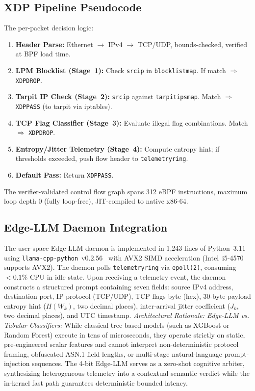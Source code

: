 \documentclass{ieeeaccess}
\renewcommand{\_}{\textunderscore\allowbreak}
\begin{document}
\subsection{XDP Pipeline Pseudocode}
The per-packet decision logic:
\begin{enumerate}\setlength{\itemsep}{0pt}
  \item \textbf{Header Parse:} Ethernet $\to$ IPv4 $\to$ TCP/UDP, bounds-checked,
    verified at BPF load time.
  \item \textbf{LPM Blocklist (Stage~1):} Check \texttt{src\_ip} in
    \texttt{blocklist\_map}. If match $\Rightarrow$ \texttt{XDP\_DROP}.
  \item \textbf{Tarpit IP Check (Stage~2):} \texttt{src\_ip} against
    \texttt{tarpit\_ips\_map}. Match $\Rightarrow$ \texttt{XDP\_PASS} (to tarpit
    via iptables).
  \item \textbf{TCP Flag Classifier (Stage~3):} Evaluate illegal flag combinations.
    Match $\Rightarrow$ \texttt{XDP\_DROP}.
  \item \textbf{Entropy/Jitter Telemetry (Stage~4):} Compute entropy hint; if
    thresholds exceeded, push flow header to \texttt{telemetry\_ring}.
  \item \textbf{Default Pass:} Return \texttt{XDP\_PASS}.
\end{enumerate}
The verifier-validated control flow graph spans 312 eBPF instructions, maximum
loop depth 0 (fully loop-free), JIT-compiled to native x86-64.

\subsection{Edge-LLM Daemon Integration}
The user-space Edge-LLM daemon is implemented in 1{,}243 lines of Python~3.11
using \texttt{llama-cpp-python}~v0.2.56~\cite{llamacpp2024} with AVX2 SIMD
acceleration (Intel~i5-4570 supports AVX2). The daemon polls
\texttt{telemetry\_ring} via \texttt{epoll(2)}, consuming $< 0.1\%$ CPU in
idle state. Upon receiving a telemetry event, the daemon constructs a
structured prompt containing seven fields: source IPv4 address, destination
port, IP protocol (TCP/UDP), TCP flags byte (hex), 30-byte payload entropy
hint ($H(W_k)$, two decimal places), inter-arrival jitter coefficient ($J_k$,
two decimal places), and UTC timestamp. 
\textit{Architectural Rationale: Edge-LLM vs. Tabular Classifiers:} While classical tree-based models (such as XGBoost or Random Forest) execute in tens of microseconds, they operate strictly on static, pre-engineered scalar features and cannot interpret non-deterministic protocol framing, obfuscated ASN.1 field lengths, or multi-stage natural-language prompt-injection sequences. The 4-bit Edge-LLM serves as a zero-shot cognitive arbiter, synthesizing heterogeneous telemetry into a contextual semantic verdict while the in-kernel fast path guarantees deterministic bounded latency.
\end{document}
